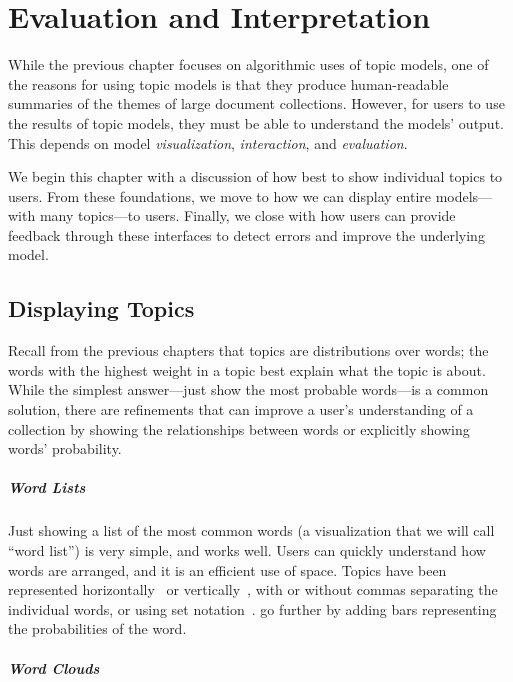 \chapter{Evaluation and Interpretation}
\label{ch:viz}

While the previous chapter focuses on algorithmic uses of topic
models, one of the reasons for using topic models is that they produce
human-readable summaries of the themes of large document collections.  However,
for users to use the results of topic models, they must be able to understand
the models' output.  This depends on model \emph{visualization},
\emph{interaction}, and \emph{evaluation}.

We begin this chapter with a discussion of how best to show individual
topics to users.  From these foundations, we move to how we can
display entire models---with many topics---to users.  Finally, we
close with how users can provide feedback through these interfaces to
detect errors and improve the underlying model.

\section{Displaying Topics}
\label{sec:display}

Recall from the previous chapters that topics are distributions over words; the
words with the highest weight in a topic best explain what the topic is about.
While the simplest answer---just show the most probable words---is a common
solution, there are refinements that can improve a user's understanding
of a collection by showing the relationships between words or explicitly showing
words' probability.

\paragraph{Word Lists}

Just showing a list of the most common words (a
visualization that we will call ``word list'') is very simple, and works well.
Users can quickly understand how words are arranged, and it is an efficient use of
space. 
Topics have been represented horizontally~\citep{gardner-10,smith2015visual} or
vertically~\citep{eisenstein2012topicviz,chaney-12}, with or without
commas separating the individual words, or using set
notation~\citep{chaney-12}.  \citet{smith2015visual} go further by
adding bars representing the probabilities of the word.

\paragraph{Word Clouds}

